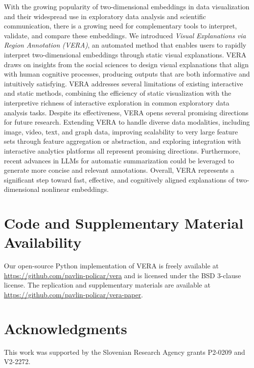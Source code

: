 \documentclass[lettersize,journal]{IEEEtran}
\begin{document}
With the growing popularity of two-dimensional embeddings in data visualization and their widespread use in exploratory data analysis and scientific communication, there is a growing need for complementary tools to interpret, validate, and compare these embeddings.
We introduced \textit{Visual Explanations via Region Annotation (VERA)}, an automated method that enables users to rapidly interpret two-dimensional embeddings through static visual explanations.
VERA draws on insights from the social sciences to design visual explanations that align with human cognitive processes, producing outputs that are both informative and intuitively satisfying.
VERA addresses several limitations of existing interactive and static methods, combining the efficiency of static visualization with the interpretive richness of interactive exploration in common exploratory data analysis tasks.
Despite its effectiveness, VERA opens several promising directions for future research.
Extending VERA to handle diverse data modalities, including image, video, text, and graph data, improving scalability to very large feature sets through feature aggregation or abstraction, and exploring integration with interactive analytics platforms all represent promising directions. Furthermore, recent advances in LLMs for automatic summarization could be leveraged to generate more concise and relevant annotations.
Overall, VERA represents a significant step toward fast, effective, and cognitively aligned explanations of two-dimensional nonlinear embeddings.


\section*{Code and Supplementary Material Availability}

Our open-source Python implementation of VERA is freely available at \url{https://github.com/pavlin-policar/vera} and is licensed under the BSD 3-clause license. The replication and supplementary materials are available at \url{https://github.com/pavlin-policar/vera-paper}.


\section*{Acknowledgments}
This work was supported by the Slovenian Research Agency grants P2-0209 and V2-2272.
 
%



\end{document}
